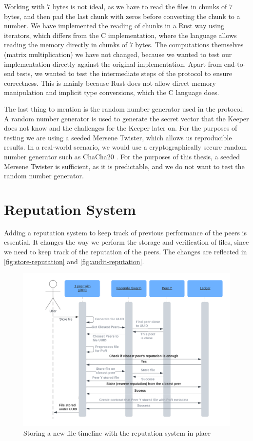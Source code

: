 Working with 7 bytes is not ideal, as we have to read the files in chunks of 7 bytes,
and then pad the last chunk with zeros before converting the chunk to a number.
We have implemented the reading of chunks in a Rust way using iterators,
which differs from the C implementation, where the language allows reading the memory directly in
chunks of 7 bytes.
The computations themselves (matrix multiplication) we have not changed,
because we wanted to test our implementation directly against the original implementation.
Apart from end-to-end tests, we wanted to test the intermediate steps of the protocol
to ensure correctness.
This is mainly because Rust does not allow direct memory manipulation and implicit type conversions,
which the C language does.

The last thing to mention is the random number generator used in the protocol.
A random number generator is used to generate the secret vector that the Keeper does not know
and the challenges for the Keeper later on.
For the purposes of testing we are using a seeded Mersene Twister, which allows us reproducible results.
In a real-world scenario, we would use a cryptographically secure random number generator
such as ChaCha20 \cite{chacha}.
For the purposes of this thesis, a seeded Mersene Twister is sufficient,
as it is predictable, and we do not want to test the random number generator.

\section{Reputation System}
\label{section:reputation-system}

Adding a reputation system to keep track of previous performance of the peers is essential.
It changes the way we perform the storage and verification of files,
since we need to keep track of the reputation of the peers.
The changes are reflected in \autoref{fig:store-reputation} and \autoref{fig:audit-reputation}.

\begin{figure}
    \centering
    \includegraphics[width=1\textwidth]{gfx/store-reputation.png}
    \caption{Storing a new file timeline with the reputation system in place}
    \label{fig:store-reputation}
\end{figure}

